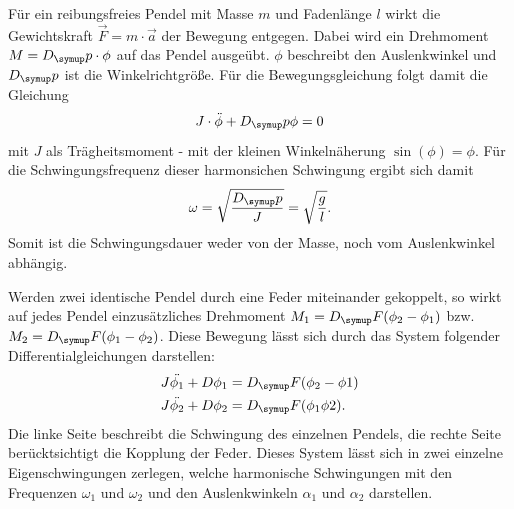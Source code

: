 Für ein reibungsfreies Pendel mit Masse $m$ und Fadenlänge $l$ wirkt die Gewichtskraft
$\vec{F} = m \cdot \vec{a}$ der Bewegung entgegen. Dabei wird ein Drehmoment
$M = D_\su{p} \cdot \phi$ auf das Pendel ausgeübt. $\phi$ beschreibt den Auslenkwinkel
und $D_\su{p}$ ist die Winkelrichtgröße. Für die Bewegungsgleichung folgt damit die
Gleichung
\begin{equation}
  J \cdot \ddot{\phi} + D_\su{p}\phi = 0
\end{equation}
mit $J$ als Trägheitsmoment - mit der kleinen Winkelnäherung $\sin{(\phi)} = \phi$.
Für die Schwingungsfrequenz dieser harmonsichen Schwingung ergibt sich damit
\begin{equation}
  \omega = \sqrt{\frac{D_\su{p}}{J}} = \sqrt{\frac{g}{l}}.
\end{equation}
Somit ist die Schwingungsdauer weder von der Masse, noch vom Auslenkwinkel abhängig.

Werden zwei identische Pendel durch eine Feder miteinander gekoppelt, so wirkt
auf jedes Pendel einzusätzliches Drehmoment $M_1 = D_\su{F}(\phi_2-\phi_1)$
bzw. $M_2 = D_\su{F}(\phi_1-\phi_2)$. Diese Bewegung lässt sich durch das System
folgender Differentialgleichungen darstellen:
\begin{align}
  J \ddot{\phi_1} + D\phi_1 &= D_\su{F} (\phi_2-\phi1) \\
  J \ddot{\phi_2} + D\phi_2 &= D_\su{F} (\phi_1\phi2) .
\end{align}
Die linke Seite beschreibt die Schwingung des einzelnen Pendels, die rechte Seite
berücktsichtigt die Kopplung der Feder.
Dieses System lässt sich in zwei einzelne Eigenschwingungen zerlegen, welche
harmonische Schwingungen mit den Frequenzen $\omega_1$ und $\omega_2$ und den Auslenkwinkeln
$\alpha_1$ und $\alpha_2$ darstellen.

